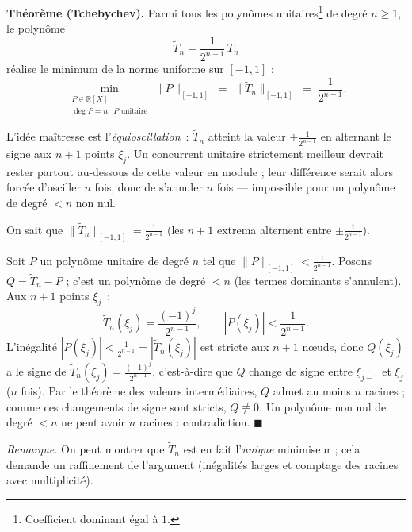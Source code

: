 \decsep{}


\begin{tcolorbox}[thmbox]
  \textbf{Théorème (Tchebychev).}\enspace%
  Parmi tous les polynômes unitaires\footnote{%
    Coefficient dominant égal à $1$.}
  de degré $n \geq 1$, le polynôme
  \[
    \widetilde{T}_n = \frac{1}{2^{n-1}}\,T_n
  \]
  réalise le minimum de la norme uniforme sur $[-1,1]$ :
  \[
    \min_{\substack{P \in \mathbb{R}[X] \\ \deg P = n,\; P \text{ unitaire}}}
    \|P\|_{[-1,1]}
    \;=\;
    \|\widetilde{T}_n\|_{[-1,1]}
    \;=\;
    \frac{1}{2^{n-1}}.
  \]
\end{tcolorbox}

\begin{significationintuitive}
  L'idée maîtresse est l'\emph{équioscillation}~: $\widetilde{T}_n$ atteint
  la valeur $\pm\frac{1}{2^{n-1}}$ en alternant le signe aux $n+1$ points
  $\xi_j$. Un concurrent unitaire strictement meilleur devrait rester
  partout au-dessous de cette valeur en module ; leur différence serait alors
  forcée d'osciller $n$ fois, donc de s'annuler $n$ fois — impossible pour un
  polynôme de degré $<n$ non nul.
\end{significationintuitive}


\begin{mdframed}[style=proofbar]
  On sait que $\|\widetilde{T}_n\|_{[-1,1]} = \frac{1}{2^{n-1}}$ (les $n+1$
  extrema alternent entre $\pm\frac{1}{2^{n-1}}$).

  \smallskip
  Soit $P$ un polynôme unitaire de degré $n$ tel que $\|P\|_{[-1,1]} <
  \frac{1}{2^{n-1}}$.
  Posons $Q = \widetilde{T}_n - P$ ; c'est un polynôme de degré $< n$
  (les termes dominants s'annulent). Aux $n+1$ points $\xi_j$~:
  \[
    \widetilde{T}_n(\xi_j) = \frac{{(-1)}^j}{2^{n-1}}, \qquad
    |P(\xi_j)| < \frac{1}{2^{n-1}}.
  \]
  L'inégalité $|P(\xi_j)| < \frac{1}{2^{n-1}} = |\widetilde{T}_n(\xi_j)|$
  est stricte aux $n+1$ nœuds, donc $Q(\xi_j)$ a le signe de
  $\widetilde{T}_n(\xi_j) = \frac{{(-1)}^j}{2^{n-1}}$, c'est-à-dire que $Q$
  change de signe entre $\xi_{j-1}$ et $\xi_j$ ($n$ fois).
  Par le théorème des valeurs intermédiaires, $Q$ admet au moins $n$
  racines ; comme ces changements de signe sont stricts, $Q \not\equiv 0$.
  Un polynôme non nul de degré $< n$ ne peut avoir $n$ racines :
  contradiction. \hfill$\blacksquare$

  \smallskip
  \emph{Remarque.} On peut montrer que $\widetilde{T}_n$ est en fait
  l'\emph{unique} minimiseur ; cela demande un raffinement de l'argument
  (inégalités larges et comptage des racines avec multiplicité).
\end{mdframed}

